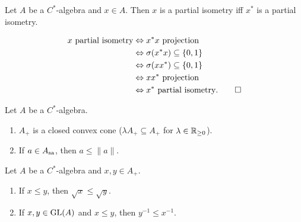 \begin{corollary}
  Let $A$ be a $C^*$-algebra and $x \in A$. Then $x$ is a partial isometry iff $x^*$ is a partial isometry.
\end{corollary}

\begin{myproof}
  \begin{align*}
    \textrm{$x$ partial isometry} &\Leftrightarrow \textrm{$x^*x$ projection}\\
    &\Leftrightarrow {\sigma(x^* x) \subseteq \{0, 1\}}\\
    &\Leftrightarrow \sigma(x x^*) \subseteq \{0, 1\}\\
    &\Leftrightarrow \textrm{$xx^*$ projection}\\
    &\Leftrightarrow \textrm{$x^*$ partial isometry}. \qedhere
  \end{align*}
\end{myproof}

\begin{corollary}
  Let $A$ be a $C^*$-algebra.
  \begin{enumerate}
    \item $A_+$ is a closed convex cone ($\lambda A_+ \subseteq A_+$ for $\lambda \in \mathbb {R}_{\geq 0}$).
    \item If $a \in A_{\operatorname{sa}}$, then $a \leq \|a\|$.
  \end{enumerate}
\end{corollary}

\begin{proposition}
  Let $A$ be a $C^*$-algebra and $x, y \in A_+$.
  \begin{enumerate}
    \item If $x \leq y$, then $\sqrt{x} \leq \sqrt{y}$.
    \item If $x, y \in \operatorname{GL}(A)$ and $x \leq y$, then $y^{-1} \leq x^{-1}$.
  \end{enumerate}
\end{proposition}

